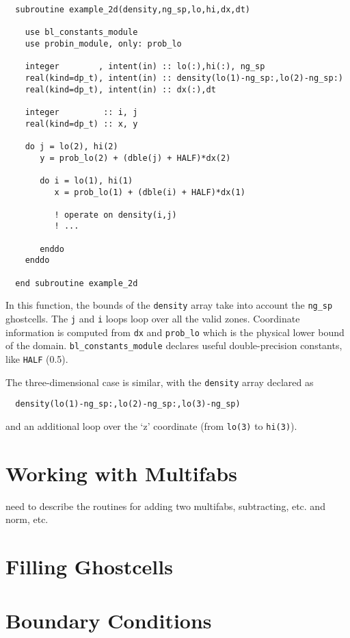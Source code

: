 \begin{verbatim}
  subroutine example_2d(density,ng_sp,lo,hi,dx,dt)

    use bl_constants_module
    use probin_module, only: prob_lo

    integer        , intent(in) :: lo(:),hi(:), ng_sp
    real(kind=dp_t), intent(in) :: density(lo(1)-ng_sp:,lo(2)-ng_sp:)
    real(kind=dp_t), intent(in) :: dx(:),dt

    integer         :: i, j
    real(kind=dp_t) :: x, y

    do j = lo(2), hi(2)
       y = prob_lo(2) + (dble(j) + HALF)*dx(2)

       do i = lo(1), hi(1)
          x = prob_lo(1) + (dble(i) + HALF)*dx(1)

          ! operate on density(i,j)
          ! ...

       enddo
    enddo

  end subroutine example_2d
\end{verbatim}

\noindent In this function, the bounds of the {\tt density} array
take into account the {\tt ng\_sp} ghostcells.  The {\tt j} and {\tt i}
loops loop over all the valid zones.  Coordinate information is 
computed from {\tt dx} and {\tt prob\_lo} which is the physical
lower bound of the domain.  {\tt bl\_constants\_module} declares
useful double-precision constants, like {\tt HALF} (0.5).

The three-dimensional case is similar, with the {\tt density} array
declared as 
\begin{verbatim}
  density(lo(1)-ng_sp:,lo(2)-ng_sp:,lo(3)-ng_sp)
\end{verbatim}
and an additional loop over the `z' coordinate (from {\tt lo(3)} to
{\tt hi(3)}).

\section{Working with Multifabs}

need to describe the routines for adding two multifabs, subtracting,
etc. and norm, etc.

\section{Filling Ghostcells}


\section{Boundary Conditions}


